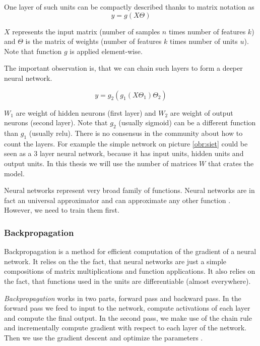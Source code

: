     One layer of such units can be compactly described thanks to matrix notation as
    $$y=g(X \Theta)$$
    
    $X$ represents the input matrix (number of samples $n$ times number of features $k$) and $\Theta$ is the matrix of weights (number of features $k$ times number of units $u$). Note that function $g$ is applied element-wise.
    
    The important observation is, that we can chain such layers to form a deeper neural network.
    
    $$y=g_2(g_1(X \Theta_1) \Theta_2)$$
    
    $W_1$ are weight of hidden neurons (first layer) and $W_2$ are weight of output neurons (second layer). Note that $g_2$ (usually sigmoid) can be a different function than $g_1$ (usually relu).
    There is no consensus in the community about how to count the layers. 
    For example the simple network on picture \ref{obr:siet} could be seen as a $3$ layer neural network,
    because it has input units, hidden units and output units.
    In this thesis we will use the number of matrices $W$ that crates the model.
    
    Neural networks represent very broad family of functions.
    Neural networks are in fact an universal approximator and can approximate any other function \cite{cybenko1989approximation}.
    However, we need to train them first.
    
    \subsubsection{Backpropagation} \label{sec:backprop}
    
    Backpropagation is a method for efficient computation of the gradient of a neural network.
    It relies on the the fact, that neural networks are just a simple compositions of matrix multiplications and function applications. 
    It also relies on the fact, that functions used in the units are differentiable (almost everywhere).
    
    \textit{Backpropagation} works in two parts, forward pass and backward pass.
    In the forward pass we feed to input to the network, compute activations of each layer and compute the final output.
    In the second pass, we make use of the chain rule and incrementally compute gradient with respect to each layer of the network.
    Then we use the gradient descent and optimize the parameters \cite{rumelhart1986david}.
    
